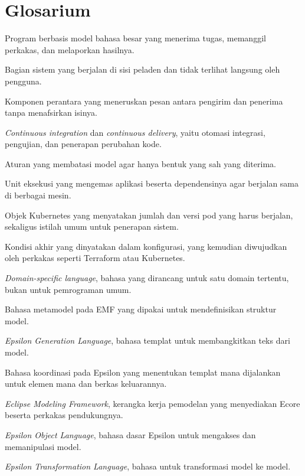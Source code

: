 \chapter{Glosarium}

\begin{description}
  \setlength{\itemsep}{2pt}
  \item[Agen] Program berbasis model bahasa besar yang menerima tugas, memanggil perkakas, dan melaporkan hasilnya.
  \item[\textit{Backend}] Bagian sistem yang berjalan di sisi peladen dan tidak terlihat langsung oleh pengguna.
  \item[\textit{Broker}] Komponen perantara yang meneruskan pesan antara pengirim dan penerima tanpa menafsirkan isinya.
  \item[CI/CD] \textit{Continuous integration} dan \textit{continuous delivery}, yaitu otomasi integrasi, pengujian, dan penerapan perubahan kode.
  \item[\textit{Constraint}] Aturan yang membatasi model agar hanya bentuk yang sah yang diterima.
  \item[\textit{Container}] Unit eksekusi yang mengemas aplikasi beserta dependensinya agar berjalan sama di berbagai mesin.
  \item[\textit{Deployment}] Objek Kubernetes yang menyatakan jumlah dan versi pod yang harus berjalan, sekaligus istilah umum untuk penerapan sistem.
  \item[\textit{Desired state}] Kondisi akhir yang dinyatakan dalam konfigurasi, yang kemudian diwujudkan oleh perkakas seperti Terraform atau Kubernetes.
  \item[DSL] \textit{Domain-specific language}, bahasa yang dirancang untuk satu domain tertentu, bukan untuk pemrograman umum.
  \item[Ecore] Bahasa metamodel pada EMF yang dipakai untuk mendefinisikan struktur model.
  \item[EGL] \textit{Epsilon Generation Language}, bahasa templat untuk membangkitkan teks dari model.
  \item[EGX] Bahasa koordinasi pada Epsilon yang menentukan templat mana dijalankan untuk elemen mana dan berkas keluarannya.
  \item[EMF] \textit{Eclipse Modeling Framework}, kerangka kerja pemodelan yang menyediakan Ecore beserta perkakas pendukungnya.
  \item[EOL] \textit{Epsilon Object Language}, bahasa dasar Epsilon untuk mengakses dan memanipulasi model.
  \item[ETL] \textit{Epsilon Transformation Language}, bahasa untuk transformasi model ke model.

\end{description}
